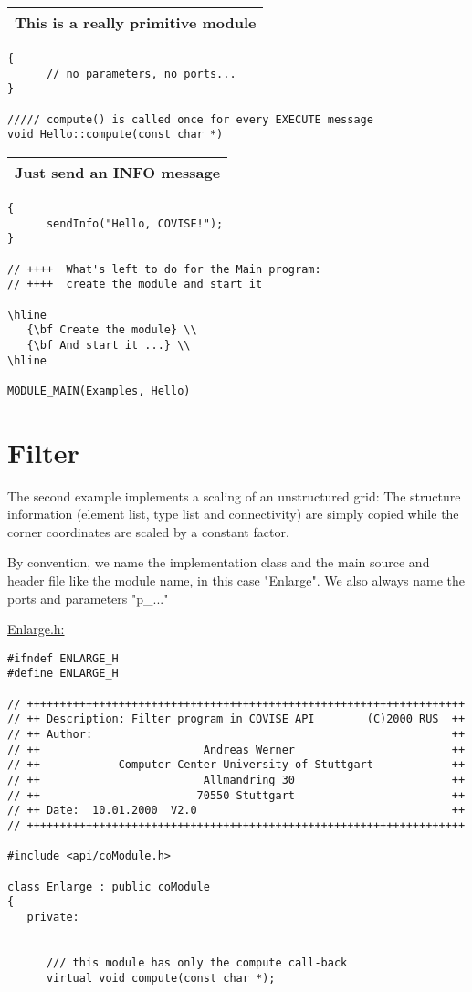 \begin{longtable}{|l|}
\hline
   {\bf This is a really primitive module} \\
\hline
\end{longtable}

\begin{verbatim}
{    
      // no parameters, no ports...
}   

///// compute() is called once for every EXECUTE message
void Hello::compute(const char *) 
\end{verbatim}

\begin{longtable}{|l|}
\hline
   {\bf Just send an INFO message} \\
\hline
\end{longtable}

\begin{verbatim}
{ 
      sendInfo("Hello, COVISE!");
} 
 
// ++++  What's left to do for the Main program: 
// ++++  create the module and start it 

\hline
   {\bf Create the module} \\
   {\bf And start it ...} \\
\hline

MODULE_MAIN(Examples, Hello)
\end{verbatim}

\section{Filter}

The second example implements a scaling of an unstructured grid: The structure 
information (element list, type list and connectivity) are simply copied while the 
corner coordinates are scaled by a constant factor.

By convention, we name the implementation class and the main source and header 
file like the module name, in this case "Enlarge". We also always name the ports 
and parameters "p\_..."

\underline{Enlarge.h:}
\begin{verbatim}
#ifndef ENLARGE_H
#define ENLARGE_H
 
// +++++++++++++++++++++++++++++++++++++++++++++++++++++++++++++++++++
// ++ Description: Filter program in COVISE API        (C)2000 RUS  ++
// ++ Author:                                                       ++
// ++                         Andreas Werner                        ++
// ++            Computer Center University of Stuttgart            ++
// ++                         Allmandring 30                        ++
// ++                        70550 Stuttgart                        ++
// ++ Date:  10.01.2000  V2.0                                       ++
// +++++++++++++++++++++++++++++++++++++++++++++++++++++++++++++++++++  
 
#include <api/coModule.h>
 
class Enlarge : public coModule
{
   private:
                                             

      /// this module has only the compute call-back
      virtual void compute(const char *);
\end{verbatim}

